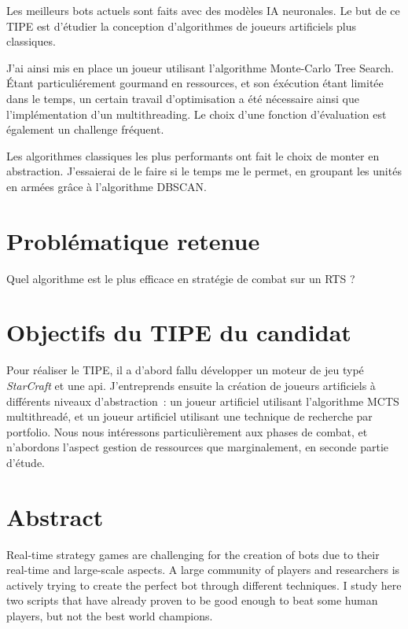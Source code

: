 \documentclass[a4paper, 11pt]{article}
\begin{document}
Les meilleurs bots actuels sont faits avec des modèles IA neuronales.
Le but de ce TIPE est d'étudier la conception d'algorithmes de joueurs artificiels plus classiques.

J'ai ainsi mis en place un joueur utilisant l'algorithme Monte-Carlo Tree Search.
Étant particuliérement gourmand en ressources, et son éxécution étant limitée dans le temps,
un certain travail d'optimisation a été nécessaire ainsi que l'implémentation d'un multithreading.
Le choix d'une fonction d'évaluation est également un challenge fréquent.\cite{MCTSRTS}\cite{MCTStactical}

Les algorithmes classiques les plus performants ont fait le choix de monter en abstraction.
J'essaierai de le faire si le temps me le permet, en groupant les unités en armées grâce à l'algorithme DBSCAN.
\cite{dbscan}\cite{combatmodel}


\section*{Problématique retenue}
Quel algorithme est le plus efficace en stratégie de combat sur un RTS ?

\section*{Objectifs du TIPE du candidat}
Pour réaliser le TIPE, il a d'abord fallu développer un moteur de jeu typé \emph{StarCraft} et une api.
J'entreprends ensuite la création de joueurs artificiels à différents niveaux d'abstraction :
un joueur artificiel utilisant l'algorithme MCTS multithreadé, et un joueur artificiel utilisant une technique de recherche par portfolio.
Nous nous intéressons particulièrement aux phases de combat, et n'abordons l'aspect gestion de ressources que marginalement, en seconde partie d'étude.

\section*{Abstract}

Real-time strategy games are challenging for the creation of bots due to their real-time and large-scale aspects.
A large community of players and researchers is actively trying to create the perfect bot through different techniques.
I study here two scripts that have already proven to be good enough to beat some human players, but not the best world champions.



\end{document}
